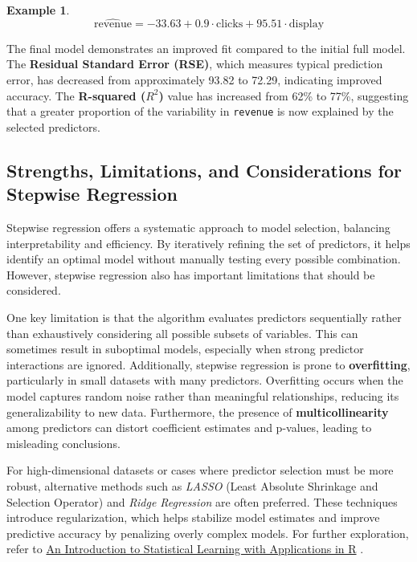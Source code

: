 \documentclass[
  11pt,
]{book}
\newcommand{\passthrough}[1]{#1}
\theoremstyle{definition}
\theoremstyle{definition}
\newtheorem{example}{Example}[chapter]
\theoremstyle{definition}
\theoremstyle{definition}
\theoremstyle{remark}
\begin{document}
\begin{example}
\[
\hat{\text{revenue}} = -33.63 + 0.9 \cdot \text{clicks} + 95.51 \cdot \text{display}
\]

The final model demonstrates an improved fit compared to the initial full model. The \textbf{Residual Standard Error (RSE)}, which measures typical prediction error, has decreased from approximately 93.82 to 72.29, indicating improved accuracy. The \textbf{R-squared (\(R^2\))} value has increased from 62\% to 77\%, suggesting that a greater proportion of the variability in \passthrough{\lstinline!revenue!} is now explained by the selected predictors.
\end{example}

\subsection*{Strengths, Limitations, and Considerations for Stepwise Regression}\label{strengths-limitations-and-considerations-for-stepwise-regression}


Stepwise regression offers a systematic approach to model selection, balancing interpretability and efficiency. By iteratively refining the set of predictors, it helps identify an optimal model without manually testing every possible combination. However, stepwise regression also has important limitations that should be considered.

One key limitation is that the algorithm evaluates predictors sequentially rather than exhaustively considering all possible subsets of variables. This can sometimes result in suboptimal models, especially when strong predictor interactions are ignored. Additionally, stepwise regression is prone to \textbf{overfitting}, particularly in small datasets with many predictors. Overfitting occurs when the model captures random noise rather than meaningful relationships, reducing its generalizability to new data. Furthermore, the presence of \textbf{multicollinearity} among predictors can distort coefficient estimates and p-values, leading to misleading conclusions.

For high-dimensional datasets or cases where predictor selection must be more robust, alternative methods such as \emph{LASSO} (Least Absolute Shrinkage and Selection Operator) and \emph{Ridge Regression} are often preferred. These techniques introduce regularization, which helps stabilize model estimates and improve predictive accuracy by penalizing overly complex models. For further exploration, refer to \href{https://www.statlearning.com}{An Introduction to Statistical Learning with Applications in R} \citep{gareth2013introduction}.
\end{document}
